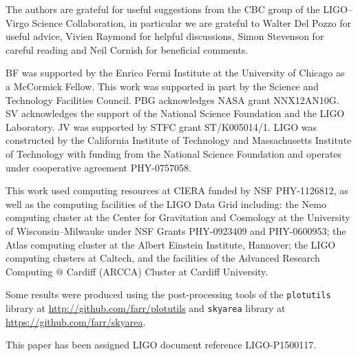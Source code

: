 \acknowledgements

The authors are grateful for useful suggestions from the CBC group of the LIGO--Virgo Science Collaboration, in particular we are grateful to Walter Del Pozzo for useful advice, Vivien Raymond for helpful discussions, Simon Stevenson for careful reading and Neil Cornish for beneficial comments.

BF was supported by the Enrico Fermi Institute at the University of Chicago as a McCormick Fellow.  This work was supported in part by the Science and Technology Facilities Council. PBG acknowledges NASA grant NNX12AN10G. SV acknowledges the support of the National Science Foundation and the LIGO Laboratory. JV was supported by STFC grant ST/K005014/1. LIGO was constructed by the California Institute of Technology and Massachusetts Institute of Technology with funding from the National Science Foundation and operates under cooperative agreement PHY-0757058.

This work used computing resources at CIERA funded by NSF PHY-1126812, as well as the computing facilities of the LIGO Data Grid including: the Nemo computing cluster at the Center for Gravitation and Cosmology at the University of Wisconsin--Milwauke under NSF Grants PHY-0923409 and PHY-0600953; the Atlas computing cluster at the Albert Einstein Institute, Hannover; the LIGO computing clusters at Caltech, and the facilities of the Advanced Research Computing @ Cardiff (ARCCA) Cluster at Cardiff University.

Some results were produced using the post-processing tools of the \texttt{plotutils} library at \url{http://github.com/farr/plotutils} and \texttt{skyarea} library at \url{https://github.com/farr/skyarea}.

This paper has been assigned LIGO document reference LIGO-P1500117.
  
  
  
  
  
  
  
  
  
  